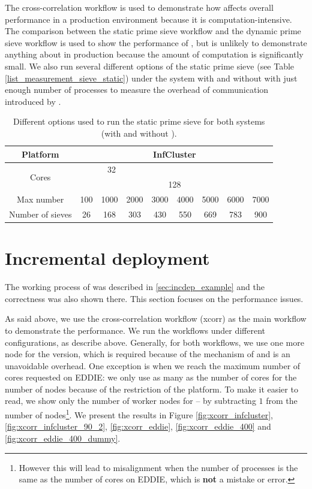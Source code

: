 The cross-correlation workflow is used to demonstrate how \tincdep affects overall performance in a production environment because it is computation-intensive. The comparison between the static prime sieve workflow and the dynamic prime sieve workflow is used to show the performance of \tdynexp, but is unlikely to demonstrate anything about \tincdep in production because the amount of computation is significantly small. We also run several different options of the static prime sieve (see Table \ref{list_measurement_sieve_static}) under the \dpy system with and without \tincdep with just enough number of processes to measure the overhead of communication introduced by \tincdep.

\begin{table}[h]
\centering
\begin{tabular}{ccccccccc}
\hline
Platform & \multicolumn{8}{c}{InfCluster} \\ \hline
\multirow{2}{*}{Cores} &
\multicolumn{3}{c|}{32} \\ \cline{2-9}
& \multicolumn{8}{c}{128} \\ \hline
Max number & 100 & 1000 & 2000 & 3000 & 4000 & 5000 & 6000 & 7000 \\ \hline
Number of sieves & 26 & 168 & 303 & 430 & 550 & 669 & 783 & 900 \\ \hline
\end{tabular}
\caption{Different options used to run the static prime sieve for both systems (with and without \tincdep).}
\label{tbl:list_measurement_sieve_static}
\end{table}

\section{Incremental deployment}
The working process of \tincdep was described in \ref{sec:incdep_example} and the correctness was also shown there. This section focuses on the performance issues.

As said above, we use the cross-correlation workflow (xcorr) as the main workflow to demonstrate the performance. We run the workflows under different configurations, as describe above. Generally, for both workflows, we use one more node for the \tincdep version, which is required because of the mechanism of \tincdep and is an unavoidable overhead. One exception is when we reach the maximum number of cores requested on EDDIE: we only use as many as the number of cores for the number of nodes because of the restriction of the platform. To make it easier to read, we show only the number of worker nodes for \tincdep -- by subtracting $1$ from the number of nodes\footnote{However this will lead to misalignment when the number of processes is the same as the number of cores on EDDIE, which is \textbf{not} a mistake or error.}. We present the results in Figure \ref{fig:xcorr_infcluster}, \ref{fig:xcorr_infcluster_90_2}, \ref{fig:xcorr_eddie}, \ref{fig:xcorr_eddie_400} and \ref{fig:xcorr_eddie_400_dummy}.

